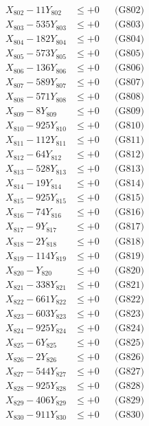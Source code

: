 \documentclass[a4paper,10pt]{article}
\begin{document}
{\begin{align}
X_{802} - 11Y_{802} &\leq +0 && \text{(G802)} \\
X_{803} - 535Y_{803} &\leq +0 && \text{(G803)} \\
X_{804} - 182Y_{804} &\leq +0 && \text{(G804)} \\
X_{805} - 573Y_{805} &\leq +0 && \text{(G805)} \\
X_{806} - 136Y_{806} &\leq +0 && \text{(G806)} \\
X_{807} - 589Y_{807} &\leq +0 && \text{(G807)} \\
X_{808} - 571Y_{808} &\leq +0 && \text{(G808)} \\
X_{809} - 8Y_{809} &\leq +0 && \text{(G809)} \\
X_{810} - 925Y_{810} &\leq +0 && \text{(G810)} \\
\allowbreak
X_{811} - 112Y_{811} &\leq +0 && \text{(G811)} \\
X_{812} - 64Y_{812} &\leq +0 && \text{(G812)} \\
X_{813} - 528Y_{813} &\leq +0 && \text{(G813)} \\
X_{814} - 19Y_{814} &\leq +0 && \text{(G814)} \\
X_{815} - 925Y_{815} &\leq +0 && \text{(G815)} \\
X_{816} - 74Y_{816} &\leq +0 && \text{(G816)} \\
X_{817} - 9Y_{817} &\leq +0 && \text{(G817)} \\
X_{818} - 2Y_{818} &\leq +0 && \text{(G818)} \\
X_{819} - 114Y_{819} &\leq +0 && \text{(G819)} \\
X_{820} - Y_{820} &\leq +0 && \text{(G820)} \\
\allowbreak
X_{821} - 338Y_{821} &\leq +0 && \text{(G821)} \\
X_{822} - 661Y_{822} &\leq +0 && \text{(G822)} \\
X_{823} - 603Y_{823} &\leq +0 && \text{(G823)} \\
X_{824} - 925Y_{824} &\leq +0 && \text{(G824)} \\
X_{825} - 6Y_{825} &\leq +0 && \text{(G825)} \\
X_{826} - 2Y_{826} &\leq +0 && \text{(G826)} \\
X_{827} - 544Y_{827} &\leq +0 && \text{(G827)} \\
X_{828} - 925Y_{828} &\leq +0 && \text{(G828)} \\
X_{829} - 406Y_{829} &\leq +0 && \text{(G829)} \\
X_{830} - 911Y_{830} &\leq +0 && \text{(G830)} \\

\end{align}}
\end{document}
